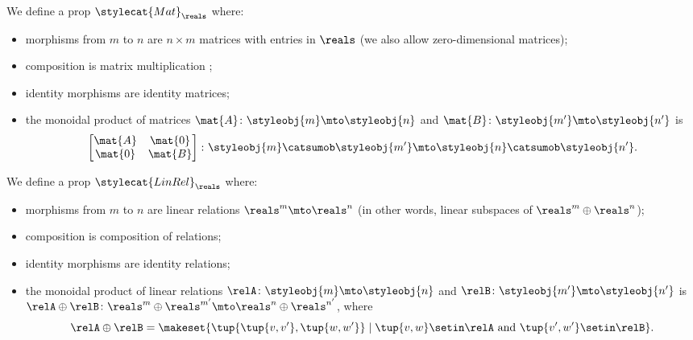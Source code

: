 \begin{example}\label{exa:prop-mat}
    We define a prop $\stylecat{Mat}_\reals$ where:
    \begin{itemize}
        \item morphisms from $m$ to $n$ are $n \times m$ matrices with entries in $\reals$ (we also allow zero-dimensional matrices);
        \item composition is matrix multiplication ;
        \item identity morphisms are identity matrices;
        \item the monoidal product of matrices $\mat{A} \colon \styleobj{m} \mto \styleobj{n}$ and $\mat{B} \colon \styleobj{m'} \mto \styleobj{n'}$ is
              \begin{equation}
                  \begin{bmatrix}
                      \mat{A} & \mat{0} \\
                      \mat{0} & \mat{B}
                  \end{bmatrix}
                  \colon \styleobj{m} \catsumob \styleobj{m'} \mto \styleobj{n} \catsumob \styleobj{n'}.
              \end{equation}
    \end{itemize}
\end{example}

\begin{example}\label{exa:prop-linrel}
    We define a prop $\stylecat{LinRel}_\reals$ where:
    \begin{itemize}
        \item morphisms from $m$ to $n$ are linear relations $\reals^m \mto \reals^n$ (in other words, linear subspaces of $\reals^m \oplus \reals^n$);
        \item composition is composition of relations;
        \item identity morphisms are identity relations;
        \item the monoidal product of linear relations $\relA \colon \styleobj{m} \mto \styleobj{n}$ and $\relB \colon \styleobj{m'} \mto \styleobj{n'}$ is $\relA \oplus \relB \colon \reals^m \oplus \reals^{m'} \mto \reals^n \oplus \reals^{n'}$, where
              \begin{equation}
                  \relA \oplus \relB = \makeset{\tup{\tup{v,v'},\tup{w,w'}} \mid \tup{v,w} \setin\relA \text{ and } \tup{v', w'} \setin\relB }.
              \end{equation}

    \end{itemize}
\end{example}

